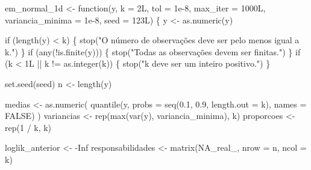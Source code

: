 \documentclass[
  letterpaper,
  DIV=11,
  numbers=noendperiod]{scrreprt}
\newenvironment{Shaded}{\begin{snugshade}}{\end{snugshade}}
\newcommand{\AttributeTok}[1]{\textcolor[rgb]{0.40,0.45,0.13}{#1}}
\newcommand{\ConstantTok}[1]{\textcolor[rgb]{0.56,0.35,0.01}{#1}}
\newcommand{\ControlFlowTok}[1]{\textcolor[rgb]{0.00,0.23,0.31}{#1}}
\newcommand{\DecValTok}[1]{\textcolor[rgb]{0.68,0.00,0.00}{#1}}
\newcommand{\FloatTok}[1]{\textcolor[rgb]{0.68,0.00,0.00}{#1}}
\newcommand{\FunctionTok}[1]{\textcolor[rgb]{0.28,0.35,0.67}{#1}}
\newcommand{\NormalTok}[1]{\textcolor[rgb]{0.00,0.23,0.31}{#1}}
\newcommand{\OtherTok}[1]{\textcolor[rgb]{0.00,0.23,0.31}{#1}}
\newcommand{\SpecialCharTok}[1]{\textcolor[rgb]{0.37,0.37,0.37}{#1}}
\newcommand{\StringTok}[1]{\textcolor[rgb]{0.13,0.47,0.30}{#1}}
\begin{document}
\begin{Shaded}
\begin{Highlighting}[]
\NormalTok{em\_normal\_1d }\OtherTok{\textless{}{-}} \ControlFlowTok{function}\NormalTok{(y,}
                         \AttributeTok{k =} \DecValTok{2}\NormalTok{L,}
                         \AttributeTok{tol =} \FloatTok{1e{-}8}\NormalTok{,}
                         \AttributeTok{max\_iter =} \DecValTok{1000}\NormalTok{L,}
                         \AttributeTok{variancia\_minima =} \FloatTok{1e{-}8}\NormalTok{,}
                         \AttributeTok{seed =} \DecValTok{123}\NormalTok{L) \{}
\NormalTok{  y }\OtherTok{\textless{}{-}} \FunctionTok{as.numeric}\NormalTok{(y)}

  \ControlFlowTok{if}\NormalTok{ (}\FunctionTok{length}\NormalTok{(y) }\SpecialCharTok{\textless{}}\NormalTok{ k) \{}
    \FunctionTok{stop}\NormalTok{(}\StringTok{"O número de observações deve ser pelo menos igual a k."}\NormalTok{)}
\NormalTok{  \}}
  \ControlFlowTok{if}\NormalTok{ (}\FunctionTok{any}\NormalTok{(}\SpecialCharTok{!}\FunctionTok{is.finite}\NormalTok{(y))) \{}
    \FunctionTok{stop}\NormalTok{(}\StringTok{"Todas as observações devem ser finitas."}\NormalTok{)}
\NormalTok{  \}}
  \ControlFlowTok{if}\NormalTok{ (k }\SpecialCharTok{\textless{}} \DecValTok{1}\NormalTok{L }\SpecialCharTok{||}\NormalTok{ k }\SpecialCharTok{!=} \FunctionTok{as.integer}\NormalTok{(k)) \{}
    \FunctionTok{stop}\NormalTok{(}\StringTok{"k deve ser um inteiro positivo."}\NormalTok{)}
\NormalTok{  \}}

  \FunctionTok{set.seed}\NormalTok{(seed)}
\NormalTok{  n }\OtherTok{\textless{}{-}} \FunctionTok{length}\NormalTok{(y)}

\NormalTok{  medias }\OtherTok{\textless{}{-}} \FunctionTok{as.numeric}\NormalTok{(}
    \FunctionTok{quantile}\NormalTok{(y, }\AttributeTok{probs =} \FunctionTok{seq}\NormalTok{(}\FloatTok{0.1}\NormalTok{, }\FloatTok{0.9}\NormalTok{, }\AttributeTok{length.out =}\NormalTok{ k), }\AttributeTok{names =} \ConstantTok{FALSE}\NormalTok{)}
\NormalTok{  )}
\NormalTok{  variancias }\OtherTok{\textless{}{-}} \FunctionTok{rep}\NormalTok{(}\FunctionTok{max}\NormalTok{(}\FunctionTok{var}\NormalTok{(y), variancia\_minima), k)}
\NormalTok{  proporcoes }\OtherTok{\textless{}{-}} \FunctionTok{rep}\NormalTok{(}\DecValTok{1} \SpecialCharTok{/}\NormalTok{ k, k)}

\NormalTok{  loglik\_anterior }\OtherTok{\textless{}{-}} \SpecialCharTok{{-}}\ConstantTok{Inf}
\NormalTok{  responsabilidades }\OtherTok{\textless{}{-}} \FunctionTok{matrix}\NormalTok{(}\ConstantTok{NA\_real\_}\NormalTok{, }\AttributeTok{nrow =}\NormalTok{ n, }\AttributeTok{ncol =}\NormalTok{ k)}


\end{Highlighting}
\end{Shaded}
\end{document}
